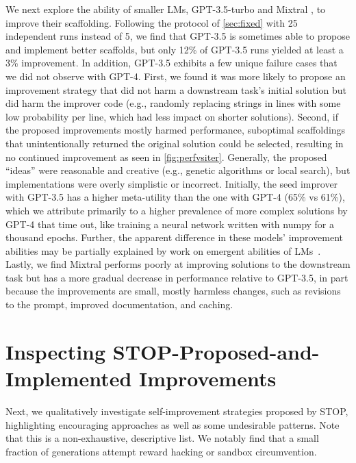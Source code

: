 \documentclass{article}
\begin{document}
We next explore the ability of smaller LMs, GPT-3.5-turbo and Mixtral \citep{jiang2024mixtral}, to improve their scaffolding. Following the protocol of \cref{sec:fixed} with 25 independent runs instead of 5, we find that GPT-3.5 is sometimes able to propose and implement better scaffolds, but only 12\% of GPT-3.5 runs yielded at least a 3\% improvement. In addition, GPT-3.5 exhibits a few unique failure cases that we did not observe with GPT-4. First, we found it was more likely to propose an improvement strategy that did not harm a downstream task's initial solution but did harm the improver code (e.g., randomly replacing strings in lines with some low probability per line, which had less impact on shorter solutions). Second, if the proposed improvements mostly harmed performance, suboptimal scaffoldings that unintentionally returned the original solution could be selected, resulting in no continued improvement as seen in \cref{fig:perfvsiter}. Generally, the proposed ``ideas'' were reasonable and creative (e.g., genetic algorithms or local search), but implementations were overly simplistic or incorrect.
Initially, the seed improver with GPT-3.5 has a higher meta-utility than the one with GPT-4 (65\% vs 61\%), which we attribute primarily to a higher prevalence of more complex solutions by GPT-4 that time out, like training a neural network written with numpy for a thousand epochs. Further, the apparent difference in these models' improvement abilities may be partially explained by work on emergent abilities of LMs~\citep{wei_emergent_2022,ganguli2022predictability,schaeffer2023are}. Lastly, we find Mixtral performs poorly at improving solutions to the downstream task but has a more gradual decrease in performance relative to GPT-3.5, in part because the improvements are small, mostly harmless changes, such as revisions to the prompt, improved documentation, and caching. \vspace{-2px}




\section{Inspecting STOP-Proposed-and-Implemented Improvements}
\vspace{-2px}
Next, we qualitatively investigate self-improvement strategies proposed by STOP, highlighting encouraging approaches as well as some undesirable patterns. Note that this is a non-exhaustive, descriptive list. We notably find that a small fraction of generations attempt reward hacking or sandbox circumvention.\vspace{-2px}
\end{document}
